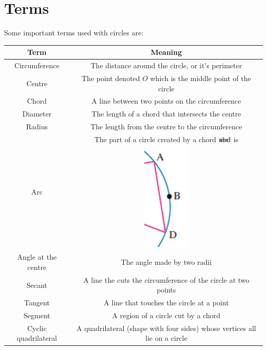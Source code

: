 \documentclass{book}
\newcommand{\arc}[1]{{\setbox9=\hbox{#1}\ooalign{\resizebox{\wd9}{\height}{\texttoptiebar{\phantom{A}}}\cr#1}}}
\begin{document}
\section{Terms}
Some important terms used with circles are:
\begin{center}
	\begin{tabular}{c|c}
		Term                 & Meaning                                                                                 \\ \hline
		Circumference        & The distance around the circle, or it's perimeter                                       \\
		Centre               & The point denoted $O$ which is the middle point of the circle                           \\
		Chord                & A line between two points on the circumference                                          \\
		Diameter             & The length of a chord that intersects the centre                                        \\
		Radius               & The length from the centre to the circumference                                         \\
		Arc                  & The part of a circle created by a chord $\arc{abd}$ is \includegraphics[scale=0.3]{arc} \\
		Angle at the centre  & The angle made by two radii                                                             \\
		Secant               & A line the cuts the circumference of the circle at two points                           \\
		Tangent              & A line that touches the circle at a point                                               \\
		Segment              & A region of a circle cut by a chord                                                     \\
		Cyclic quadrilateral & A quadrilateral (shape with four sides) whose vertices all lie on a circle              \\
	\end{tabular}
\end{center}
\end{document}
